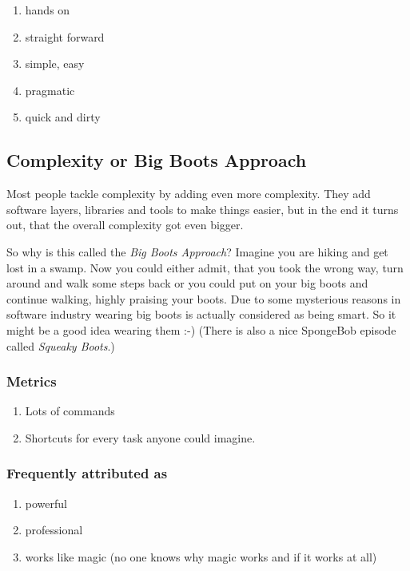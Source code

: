 \begin{enumerate}
\item
  hands on
\item
  straight forward
\item
  simple, easy
\item
  pragmatic
\item
  quick and dirty
\end{enumerate}

\subsection{Complexity or Big Boots Approach}

Most people tackle complexity by adding even more complexity. They add
software layers, libraries and tools to make things easier, but in the
end it turns out, that the overall complexity got even bigger.

So why is this called the \emph{Big Boots Approach}? Imagine you are
hiking and get lost in a swamp. Now you could either admit, that you
took the wrong way, turn around and walk some steps back or you could
put on your big boots and continue walking, highly praising your boots.
Due to some mysterious reasons in software industry wearing big boots is
actually considered as being smart. So it might be a good idea wearing
them :-) (There is also a nice SpongeBob episode called \emph{Squeaky
Boots}.)

\subsubsection{Metrics}

\begin{enumerate}
\item
  Lots of commands
\item
  Shortcuts for every task anyone could imagine.
\end{enumerate}

\subsubsection{Frequently attributed as}

\begin{enumerate}
\item
  powerful
\item
  professional
\item
  works like magic (no one knows why magic works and if it works at all)
\end{enumerate}

